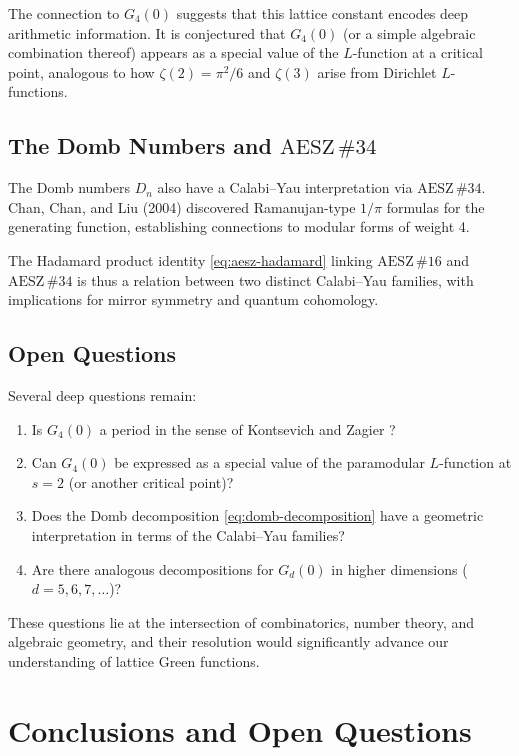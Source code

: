 \documentclass[12pt,a4paper]{article}
\numberwithin{equation}{section}
\theoremstyle{plain}
\theoremstyle{definition}
\theoremstyle{remark}
\newcommand{\aesz}[1]{\mathrm{AESZ}\,\#\!{#1}}
\begin{document}
The connection to $G_4(0)$ suggests that this lattice constant encodes deep arithmetic information.
It is conjectured that $G_4(0)$ (or a simple algebraic combination thereof) appears as a special
value of the $L$-function at a critical point, analogous to how $\zeta(2) = \pi^2/6$ and
$\zeta(3)$ arise from Dirichlet $L$-functions.

\subsection{The Domb Numbers and $\aesz{34}$}

The Domb numbers $D_n$ also have a Calabi--Yau interpretation via $\aesz{34}$.
Chan, Chan, and Liu (2004) \cite{ChanChanLiu2004} discovered Ramanujan-type $1/\pi$ formulas
for the generating function, establishing connections to modular forms of weight 4.

The Hadamard product identity \eqref{eq:aesz-hadamard} linking $\aesz{16}$ and $\aesz{34}$
is thus a relation between two distinct Calabi--Yau families, with implications for mirror symmetry
and quantum cohomology.

\subsection{Open Questions}

Several deep questions remain:
\begin{enumerate}[leftmargin=*,itemsep=3pt]
  \item Is $G_4(0)$ a period in the sense of Kontsevich and Zagier \cite{KontsevichZagier2001}?
  \item Can $G_4(0)$ be expressed as a special value of the paramodular $L$-function at $s = 2$
        (or another critical point)?
  \item Does the Domb decomposition \eqref{eq:domb-decomposition} have a geometric interpretation
        in terms of the Calabi--Yau families?
  \item Are there analogous decompositions for $G_d(0)$ in higher dimensions ($d = 5, 6, 7, \ldots$)?
\end{enumerate}

These questions lie at the intersection of combinatorics, number theory, and algebraic geometry,
and their resolution would significantly advance our understanding of lattice Green functions.

\section{Conclusions and Open Questions}\label{sec:conclusion}
\end{document}
